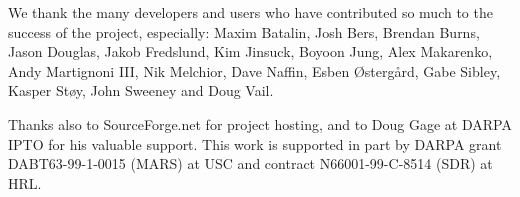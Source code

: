 \documentclass[a4paper]{ICAR2003}
\begin{document}
\begin{Acknowledgment}
We thank the many developers and users who have contributed so much to the
success of the project, especially: 
Maxim Batalin,
Josh Bers,
Brendan Burns,
Jason Douglas,
Jakob Fredslund,
Kim Jinsuck,
Boyoon Jung,
Alex Makarenko,
Andy Martignoni III,
Nik Melchior,
Dave Naffin,
Esben \O{}sterg\aa{}rd,
Gabe Sibley,
Kasper St{\o}y,
John Sweeney 
and
Doug Vail.

Thanks also to SourceForge.net for project hosting, and to Doug Gage
at DARPA IPTO for his valuable support. This work is supported in part
by DARPA grant DABT63-99-1-0015 (MARS) at USC and contract
N66001-99-C-8514 (SDR) at HRL.
\end{Acknowledgment}


\renewcommand{\baselinestretch}{0}
{\small

}
\end{document}
